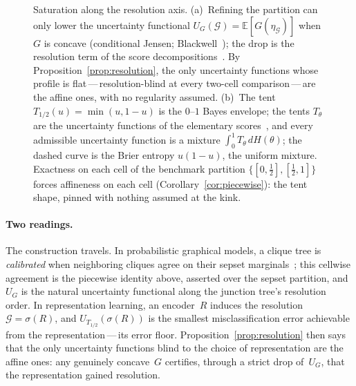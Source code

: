 \documentclass{article}
\theoremstyle{plain}
\theoremstyle{definition}
\newcommand{\E}{\mathbb{E}}
\begin{document}
\begin{figure}[ht]
\caption{Saturation along the resolution axis. (a)~Refining the
partition can only lower the uncertainty functional
$U_G(\mathcal{G})=\E[G(\eta_{\mathcal{G}})]$ when $G$ is concave
(conditional Jensen; Blackwell~\cite{Blackwell1953}); the drop is the
resolution term of the score
decompositions~\cite{Murphy1973,Brocker2009,DGJ2021}. By
Proposition~\ref{prop:resolution}, the only uncertainty functions
whose profile is flat\,---\,resolution-blind at every two-cell
comparison\,---\,are the affine ones, with no regularity assumed.
(b)~The tent $T_{1/2}(u)=\min(u,1-u)$ is the $0$--$1$ Bayes envelope;
the tents $T_\theta$ are the uncertainty functions of the elementary
scores~\cite{Schervish1989,EGJK2016}, and every admissible
uncertainty function is a mixture $\int_0^1 T_\theta\,dH(\theta)$;
the dashed curve is the Brier entropy $u(1-u)$, the uniform mixture.
Exactness on each cell of the benchmark partition
$\{[0,\tfrac12],[\tfrac12,1]\}$ forces affineness on each cell
(Corollary~\ref{cor:piecewise}): the tent shape, pinned with nothing
assumed at the kink.}
\label{fig:resolution}
\end{figure}

\paragraph{Two readings.}
The construction travels. In probabilistic graphical models, a clique
tree is \emph{calibrated} when neighboring cliques agree on their
sepset marginals~\cite{KollerFriedman2009}; this cellwise agreement
is the piecewise identity above, asserted over the sepset partition,
and $U_G$ is the natural uncertainty functional along the junction
tree's resolution order. In representation learning, an encoder~$R$
induces the resolution $\mathcal{G}=\sigma(R)$, and
$U_{T_{1/2}}(\sigma(R))$ is the smallest misclassification error
achievable from the representation\,---\,its error floor.
Proposition~\ref{prop:resolution} then says that the only uncertainty
functions blind to the choice of representation are the affine ones:
any genuinely concave~$G$ certifies, through a strict drop of~$U_G$,
that the representation gained resolution.
\end{document}
